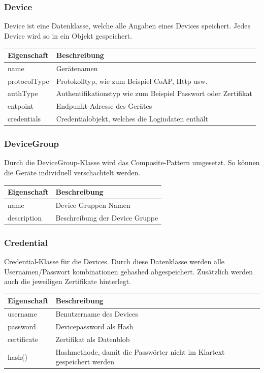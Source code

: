 \subsubsection{Device}
Device ist eine Datenklasse, welche alle Angaben eines Devices speichert. Jedes Device wird so in ein Objekt gespeichert.
\begin{table}[H]
\centering
    \begin{tabular}{@{}l p{14.1cm} @{}}\toprule    
    {Eigenschaft} & {Beschreibung}\\ \midrule      
    name & Gerätenamen \\
    protocolType & Protokolltyp, wie zum Beispiel CoAP, Http usw. \\
    authType & Authentifikationstyp wie zum Beispiel Passwort oder Zertifikat  \\
    entpoint & Endpunkt-Adresse des Gerätes \\
    credentials & Credentialobjekt, welches die Logindaten enthält
\\    \bottomrule
    \end{tabular}
\end{table}

\subsubsection{DeviceGroup}
Durch die DeviceGroup-Klasse wird das Composite-Pattern umgesetzt. So können die Geräte individuell verschachtelt werden.
\begin{table}[H]
\centering
    \begin{tabular}{@{}l p{14.1cm} @{}}\toprule    
    {Eigenschaft} & {Beschreibung}\\ \midrule      
    name & Device Gruppen Namen\\
    description & Beschreibung der Device Gruppe \\
    \bottomrule
    \end{tabular}
\end{table}

\subsubsection{Credential}
Credential-Klasse für die Devices. Durch diese Datenklasse werden alle Usernamen/Passwort kombinationen gehashed abgespeichert. Zusätzlich werden auch die jeweiligen Zertifikate hinterlegt.
\begin{table}[H]
\centering
    \begin{tabular}{@{}l p{14.1cm} @{}}\toprule    
    {Eigenschaft} & {Beschreibung}\\ \midrule      
    username & Benutzername des Devices \\
    password & Devicepassword als Hash\\
    certificate & Zertifikat als Datenblob\\
    hash() & Hashmethode, damit die Passwörter nicht im Klartext gespeichert werden\\
    \bottomrule
    \end{tabular}
\end{table}


